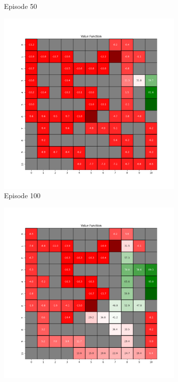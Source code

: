 \documentclass{assignment}
\begin{document}
\begin{figure}[H]
\begin{subfigure}{0.3\textwidth}
    \caption{Episode 50}
    \end{subfigure}\hfill
    \begin{subfigure}{0.3\textwidth}
        \includegraphics[width=\textwidth]{figures/value_q/alpha_sweep/value_function_alpha_0.1_gamma_0.95_epsilon_0.2_iteration_100.png}
    \caption{Episode 100}
    \end{subfigure}
    \begin{subfigure}{0.3\textwidth}
        \includegraphics[width=\textwidth]{figures/value_q/alpha_sweep/value_function_alpha_0.1_gamma_0.95_epsilon_0.2_iteration_1000.png}

\end{subfigure}
\end{figure}
\end{document}
